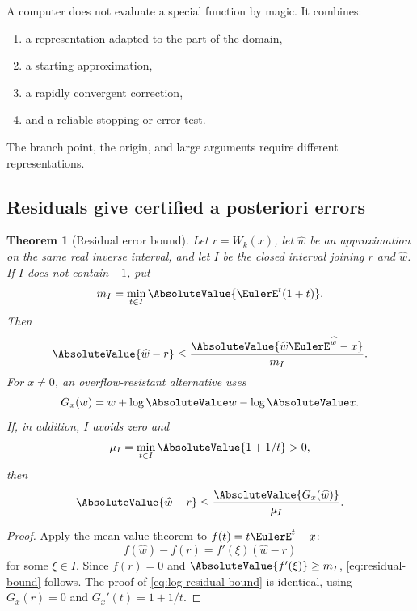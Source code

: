 \documentclass[11pt]{article}
\newtheorem{theorem}{Theorem}[section]
\theoremstyle{remark}
\newcommand{\LambertRootApproximation}{\widehat w}
\begin{document}
A computer does not evaluate a special function by magic.  It combines:
\begin{enumerate}
\item a representation adapted to the part of the domain,
\item a starting approximation,
\item a rapidly convergent correction,
\item and a reliable stopping or error test.
\end{enumerate}
The branch point, the origin, and large arguments require different
representations.

\subsection{Residuals give certified a posteriori errors}

\begin{theorem}[Residual error bound]\label{thm:residual}
Let \(r=W_k(x)\), let \(\LambertRootApproximation\) be an approximation on the same real
inverse interval, and let \(I\) be the closed interval joining \(r\) and
\(\LambertRootApproximation\).  If \(I\) does not contain \(-1\), put
\[
       m_I=\min_{t\in I}\AbsoluteValue{\EulerE^t(1+t)}.
\]
Then
\begin{equation}\label{eq:residual-bound}
 \AbsoluteValue{\LambertRootApproximation-r}
 \leq
 \frac{\AbsoluteValue{\LambertRootApproximation\EulerE^{\LambertRootApproximation}-x}}{m_I}.
\end{equation}
For \(x\neq0\), an overflow-resistant alternative uses
\[
       G_x(w)=w+\log\AbsoluteValue w-\log\AbsoluteValue x.
\]
If, in addition, \(I\) avoids zero and
\[
       \mu_I=\min_{t\in I}\AbsoluteValue{1+1/t}>0,
\]
then
\begin{equation}\label{eq:log-residual-bound}
       \AbsoluteValue{\LambertRootApproximation-r}
       \leq\frac{\AbsoluteValue{G_x(\LambertRootApproximation)}}{\mu_I}.
\end{equation}
\end{theorem}

\begin{proof}
Apply the mean value theorem to
\(f(t)=t\EulerE^t-x\):
\[
 f(\LambertRootApproximation)-f(r)
 =f'(\xi)(\LambertRootApproximation-r)
\]
for some \(\xi\in I\).  Since \(f(r)=0\) and
\(\AbsoluteValue{f'(\xi)}\geq m_I\), \eqref{eq:residual-bound} follows.
The proof of \eqref{eq:log-residual-bound} is identical, using
\(G_x(r)=0\) and \(G_x'(t)=1+1/t\).
\end{proof}
\end{document}
